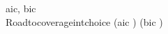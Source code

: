 \begin{circus}
\circchannel aic, bic\\
\circprocess Roadtocoverageintchoice \circdef \circbegin
	\circspot
	    (aic \then \Skip) \intchoice (bic \then \Skip) \\
	\circend
\end{circus}
